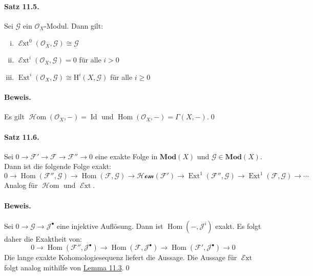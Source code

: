 \paragraph{Satz 11.5.}\label{11.5} Sei $\mathcal{G}$ ein $\mathcal{O}_X$-Modul. Dann gilt:
\begin{enumerate}[(i)]
\item $\operatorname{\mathcal{E}xt}^0(\mathcal{O}_X,\mathcal{G})\cong\mathcal{G}$
\item $\operatorname{\mathcal{E}xt}^i(\mathcal{O}_X,\mathcal{G})=0$ für alle $i>0$
\item $\operatorname{Ext}^i(\mathcal{O}_X,\mathcal{G}) \cong\mathrm{H}^i(X,\mathcal{G})$ für alle $i\geq 0$
\end{enumerate}

\paragraph{Beweis.} Es gilt $\operatorname{\mathcal{H}om}(\mathcal{O}_X,-) = \operatorname{Id}$ und $\operatorname{Hom}(\mathcal{O}_X,-)=\Gamma(X,-)$.\qed

\paragraph{Satz 11.6.}\label{11.6} Sei $0\to\mathcal{F}'\to\mathcal{F}\to\mathcal{F}''\to 0$ eine exakte Folge in $\mathbf{Mod}(X)$ und $\mathcal{G}\in\mathbf{Mod}(X)$. Dann ist die folgende Folge exakt:
\[0\longrightarrow\operatorname{Hom}(\mathcal{F}'',\mathcal{G})\longrightarrow\operatorname{Hom}(\mathcal{F},\mathcal{G})\longrightarrow\mathcal{Hom}(\mathcal{F}')\longrightarrow\operatorname{Ext}^1(\mathcal{F}'',\mathcal{G})\longrightarrow\operatorname{Ext}^1(\mathcal{F},\mathcal{G})\longrightarrow\cdots\]
Analog für $\operatorname{\mathcal{H}om}$ und $\operatorname{\mathcal{E}xt}$.

\paragraph{Beweis.} Sei $0\to\mathcal{G}\to\mathcal{J}^\bullet$ eine injektive Auflösung. Dann ist $\operatorname{Hom}(-,\mathcal{J}^i)$ exakt. Es folgt daher die Exaktheit von:
\[0\longrightarrow\operatorname{Hom}(\mathcal{F}'',\mathcal{J}^\bullet)\longrightarrow\operatorname{Hom}(\mathcal{F},\mathcal{J}^\bullet)\longrightarrow\operatorname{Hom}(\mathcal{F}',\mathcal{J}^\bullet)\longrightarrow 0\]
Die lange exakte Kohomologiesequenz liefert die Aussage. Die Aussage für $\operatorname{\mathcal{E}xt}$ folgt analog mithilfe von \hyperref[11.3]{Lemma 11.3}.\qed

